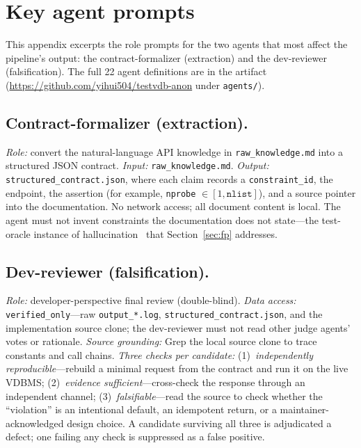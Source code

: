 \documentclass[sigconf]{acmart}
\begin{document}



\appendix
\section{Key agent prompts}\label{app:prompts}

This appendix excerpts the role prompts for the two agents that most affect the pipeline's output: the contract-formalizer (extraction) and the dev-reviewer (falsification). The full 22 agent definitions are in the artifact (\url{https://github.com/yihui504/testvdb-anon} under \texttt{agents/}).

\subsection*{Contract-formalizer (extraction).}
\emph{Role:} convert the natural-language API knowledge in \texttt{raw\_knowledge.md} into a structured JSON contract. \emph{Input:} \texttt{raw\_knowledge.md}. \emph{Output:} \texttt{structured\_contract.json}, where each claim records a \texttt{constraint\_id}, the endpoint, the assertion (for example, \texttt{nprobe} $\in [1, \texttt{nlist}]$), and a source pointer into the documentation. No network access; all document content is local. The agent must not invent constraints the documentation does not state---the test-oracle instance of hallucination~\cite{ji23hall} that Section~\ref{sec:fp} addresses.

\subsection*{Dev-reviewer (falsification).}
\emph{Role:} developer-perspective final review (double-blind). \emph{Data access:} \texttt{verified\_only}---raw \texttt{output\_*.log}, \texttt{structured\_contract.json}, and the implementation source clone; the dev-reviewer must not read other judge agents' votes or rationale. \emph{Source grounding:} Grep the local source clone to trace constants and call chains. \emph{Three checks per candidate:} (1)~\emph{independently reproducible}---rebuild a minimal request from the contract and run it on the live VDBMS; (2)~\emph{evidence sufficient}---cross-check the response through an independent channel; (3)~\emph{falsifiable}---read the source to check whether the ``violation'' is an intentional default, an idempotent return, or a maintainer-acknowledged design choice. A candidate surviving all three is adjudicated a defect; one failing any check is suppressed as a false positive.
\end{document}
